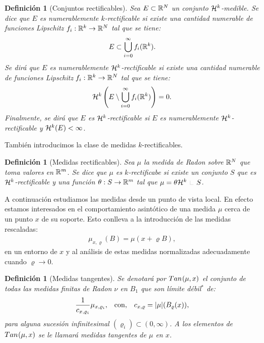 \documentclass[a4paper,11pt,spanish, twoside, leqno]{tfm-uam}
\newtheorem{defi}[teo]{Definición}
\begin{document}
\begin{defi}[Conjuntos rectificables]\label{defi:conjuntos rectificables} 
Sea $E\subset \mathbb{R}^{N}$ un conjunto $\mathcal{H}^{k}$-medible. Se dice que $E$ es numerablemente $k$-rectificable si existe una cantidad numerable de funciones Lipschitz $f_{i}:\mathbb{R}^{k}\to \mathbb{R}^{N}$ tal que se tiene:
\begin{align*}
E\subset \bigcup_{i=0}^{\infty}f_{i}(\mathbb{R}^{k}).
\end{align*}
Se dirá que $E$ es numerablemente $\mathcal{H}^{k}$-rectificable si existe una cantidad numerable de funciones Lipschitz $f_{i}:\mathbb{R}^{k}\to \mathbb{R}^{N}$ tal que se tiene:
\begin{align*}
\mathcal{H}^{k}\left( E\setminus \bigcup_{i=0}^{\infty}f_{i}(\mathbb{R}^{k})\right)=0.
\end{align*}
Finalmente, se dirá que $E$ es $\mathcal{H}^{k}$-rectificable si $E$ es numerablemente $\mathcal{H}^{k}$-rectificable y $\mathcal{H}^{k}(E)<\infty$.
\end{defi} 

También introducimos la clase de medidas $k$-rectificables.
\begin{defi}[Medidas rectificables]\label{defi:medidas rectificables} 
Sea $\mu$ la medida de Radon sobre $\mathbb{R}^{N}$ que toma valores en $\mathbb{R}^{m}$. Se dice que $\mu$ es $k$-rectificabe si existe un conjunto $S$ que es $\mathcal{H}^{k}$-rectificable y una función $\theta:S\to \mathbb{R}^{m}$ tal que $\mu=\theta \Hm{k}\Radot S$.
\end{defi}

A continuación estudiamos las medidas desde un punto de vista local. En efecto estamos interesados en el comportamiento asintótico de una medida $\mu$ cerca de un punto $x$ de su soporte. Esto conlleva a la introducción de las medidas rescaladas:
\begin{align*}
\mu_{x,\varrho}(B)=\mu(x+\varrho B),
\end{align*}
en un entorno de $x$ y al análisis de estas medidas normalizadas adecuadamente cuando $\varrho\to 0$. 
\begin{defi}[Medidas tangentes]\label{defi:medidas tangentes} 
Se denotará por $\Tan{}{\mu}{x}$ el conjunto de todas las medidas finitas de Radon $\nu$ en $B_{1}$ que son límite débil$^{*}$ de:
\begin{align}\label{defi:medidas tangentes:eq:1}
\begin{array}{lll}
\dfrac{1}{c_{x, \varrho_{i}}}\mu_{x,\varrho_{i}}, & \text{con}, & c_{x, \varrho}=\lvert\mu\rvert(B_{\varrho}(x)),
\end{array}
\end{align}
para alguna sucesión infinitesimal $(\varrho_{i})\subset (0,\infty)$. A los elementos de $\Tan{}{\mu}{x}$ se le llamará medidas tangentes de $\mu$ en $x$.
\end{defi}
\end{document}
